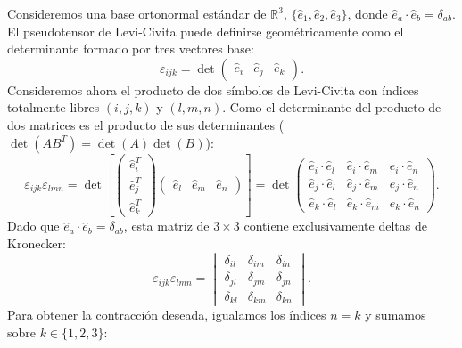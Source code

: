 \begin{appendices}
Consideremos una base ortonormal estándar de $\mathbb{R}^3$, $\{\hat{e}_1, \hat{e}_2, \hat{e}_3\}$, donde $\hat{e}_a \cdot \hat{e}_b = \delta_{ab}$. El pseudotensor de Levi-Civita puede definirse geométricamente como el determinante formado por tres vectores base:
\begin{equation}
    \varepsilon_{ijk} = \det \begin{pmatrix} \hat{e}_i & \hat{e}_j & \hat{e}_k \end{pmatrix}.
\end{equation}
Consideremos ahora el producto de dos símbolos de Levi-Civita con índices totalmente libres $(i, j, k)$ y $(l, m, n)$. Como el determinante del producto de dos matrices es el producto de sus determinantes ($\det(A B^T) = \det(A)\det(B)$):
\begin{equation}
    \varepsilon_{ijk}\varepsilon_{lmn} = \det \left[ \begin{pmatrix} \hat{e}_i^T \\ \hat{e}_j^T \\ \hat{e}_k^T \end{pmatrix} \begin{pmatrix} \hat{e}_l & \hat{e}_m & \hat{e}_n \end{pmatrix} \right] = \det \begin{pmatrix}
        \hat{e}_i \cdot \hat{e}_l & \hat{e}_i \cdot \hat{e}_m & \hat{e}_i \cdot \hat{e}_n \\
        \hat{e}_j \cdot \hat{e}_l & \hat{e}_j \cdot \hat{e}_m & \hat{e}_j \cdot \hat{e}_n \\
        \hat{e}_k \cdot \hat{e}_l & \hat{e}_k \cdot \hat{e}_m & \hat{e}_k \cdot \hat{e}_n
    \end{pmatrix}.
\end{equation}
Dado que $\hat{e}_a \cdot \hat{e}_b = \delta_{ab}$, esta matriz de $3 \times 3$ contiene exclusivamente deltas de Kronecker:
\begin{equation}
    \varepsilon_{ijk}\varepsilon_{lmn} = \begin{vmatrix}
        \delta_{il} & \delta_{im} & \delta_{in} \\
        \delta_{jl} & \delta_{jm} & \delta_{jn} \\
        \delta_{kl} & \delta_{km} & \delta_{kn}
    \end{vmatrix}.
    \label{eq:levi_civita_det3x3}
\end{equation}
Para obtener la contracción deseada, igualamos los índices $n = k$ y sumamos sobre $k \in \{1, 2, 3\}$:
\begin{equation}

\end{equation}
\end{appendices}
